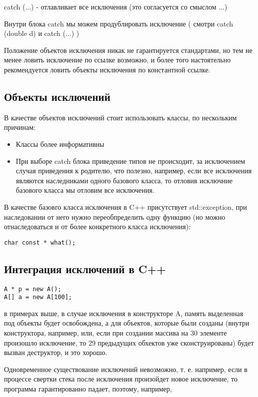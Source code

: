 catch (...) - отлавливает все исключения (это согласуется со смыслом ...)

Внутри блока catch мы можем продублировать исключение ( смотри catch (double d) и catch (...) )

Положение объектов исключения никак не гарантируется стандартами, но тем не менее ловить исключение по ссылке возможно, и более того настоятельно
рекомендуется ловить объекты исключения по константной ссылке.

\subsection{Объекты исключений}

В качестве объектов исключений стоит использовать классы, по нескольким причинам:
\begin{itemize}
\item Классы более информативны

\item При выборе catch блока приведение типов не происходит, за исключением случая приведения к родителю, что полезно, например,
если все исключения являются наследниками одного базового класса, то отловив исключние базового класса мы отловим все исключения.
\end{itemize}

В качестве базовго класса исключения в C++ присутствует std::exception, при наследовании от него нужно переобпределить одну
функцию (но можно отнаследоваться и от более конкретного класса исключения):
\begin{lstlisting}
char const * what();
\end{lstlisting}

\subsection{Интеграция исключений в C++}

\begin{lstlisting}
A * p = new A();
A[] a = new A[100];
\end{lstlisting}

в примерах выше, в случае исключения в конструкторе A, память выделенная под объекты будет освобождена, а для объектов, которые были
созданы (внутри конструктора, например, или, если при создании массива на 30 элементе произошло исключение, то 29 предыдущих обхектов
уже сконструированы) будет вызван деструктор, и это хорошо.

Одновременное существование исключений невозможно, т. е. например, если в процессе свертки стека после исключения произойдет новое исключение,
то программа гарантированно падает, поэтому, например,

